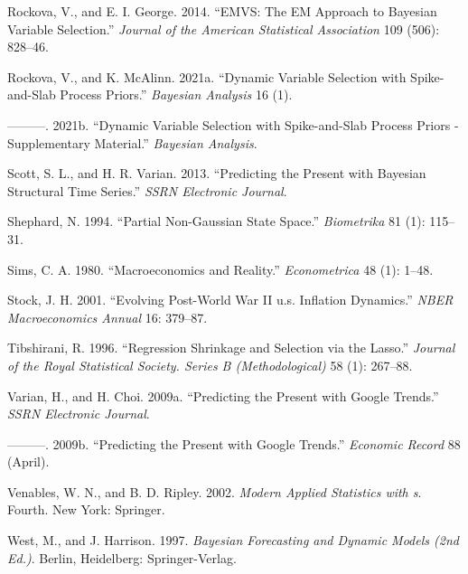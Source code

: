 \documentclass[
  12pt,
]{book}
\newlength{\cslhangindent}
\newlength{\cslentryspacingunit} %
\newenvironment{CSLReferences}[2] %
 {%
  \setlength{\parindent}{0pt}
  \ifodd #1
  \let\oldpar\par
  \def\par{\hangindent=\cslhangindent\oldpar}
  \fi
  \setlength{\parskip}{#2\cslentryspacingunit}
 }%
 {}
\theoremstyle{break}
\theoremstyle{nonumberplain}
\begin{document}
\begin{CSLReferences}{1}{0}
\leavevmode{}%
Rockova, V., and E. I. George. 2014. {``EMVS: The EM Approach to
Bayesian Variable Selection.''} \emph{Journal of the American
Statistical Association} 109 (506): 828--46.

\leavevmode{}%
Rockova, V., and K. McAlinn. 2021a. {``Dynamic Variable Selection with
Spike-and-Slab Process Priors.''} \emph{Bayesian Analysis} 16 (1).

\leavevmode{}%
---------. 2021b. {``Dynamic Variable Selection with Spike-and-Slab
Process Priors - Supplementary Material.''} \emph{Bayesian Analysis}.

\leavevmode{}%
Scott, S. L., and H. R. Varian. 2013. {``Predicting the Present with
Bayesian Structural Time Series.''} \emph{SSRN Electronic Journal}.

\leavevmode{}%
Shephard, N. 1994. {``Partial Non-Gaussian State Space.''}
\emph{Biometrika} 81 (1): 115--31.

\leavevmode{}%
Sims, C. A. 1980. {``Macroeconomics and Reality.''} \emph{Econometrica}
48 (1): 1--48.

\leavevmode{}%
Stock, J. H. 2001. {``Evolving Post-World War II u.s. Inflation
Dynamics.''} \emph{NBER Macroeconomics Annual} 16: 379--87.

\leavevmode{}%
Tibshirani, R. 1996. {``Regression Shrinkage and Selection via the
Lasso.''} \emph{Journal of the Royal Statistical Society. Series B
(Methodological)} 58 (1): 267--88.

\leavevmode{}%
Varian, H., and H. Choi. 2009a. {``Predicting the Present with Google
Trends.''} \emph{SSRN Electronic Journal}.

\leavevmode{}%
---------. 2009b. {``Predicting the Present with Google Trends.''}
\emph{Economic Record} 88 (April).

\leavevmode{}%
Venables, W. N., and B. D. Ripley. 2002. \emph{Modern Applied Statistics
with s}. Fourth. New York: Springer.

\leavevmode{}%
West, M., and J. Harrison. 1997. \emph{Bayesian Forecasting and Dynamic
Models (2nd Ed.)}. Berlin, Heidelberg: Springer-Verlag.


\end{CSLReferences}
\end{document}
